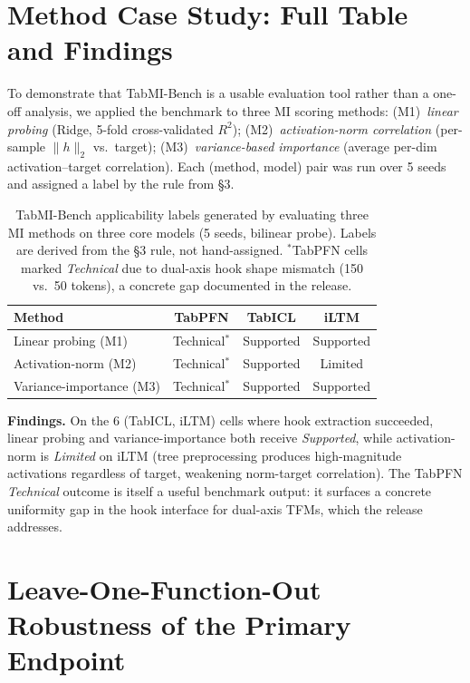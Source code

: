 \documentclass{article}
\begin{document}
\section{Method Case Study: Full Table and Findings}
\label{app:method-case-study}

To demonstrate that TabMI-Bench is a usable evaluation tool rather than a one-off analysis, we applied the benchmark to three MI scoring methods: (M1)~\emph{linear probing} (Ridge, 5-fold cross-validated $R^2$); (M2)~\emph{activation-norm correlation} (per-sample $\|h\|_2$ vs.\ target); (M3)~\emph{variance-based importance} (average per-dim activation--target correlation). Each (method, model) pair was run over 5 seeds and assigned a label by the rule from \S3.

\begin{table}[htbp]
\centering
\caption{TabMI-Bench applicability labels generated by evaluating three MI methods on three core models (5 seeds, bilinear probe). Labels are derived from the \S3 rule, not hand-assigned. $^{*}$TabPFN cells marked \emph{Technical} due to dual-axis hook shape mismatch (150 vs.\ 50 tokens), a concrete gap documented in the release.}
\label{tab:method-case-study}
\small
\begin{tabular}{@{}l c c c@{}}
\toprule
Method & TabPFN & TabICL & iLTM \\
\midrule
Linear probing (M1) & Technical$^{*}$ & Supported & Supported \\
Activation-norm (M2) & Technical$^{*}$ & Supported & Limited \\
Variance-importance (M3) & Technical$^{*}$ & Supported & Supported \\
\bottomrule
\end{tabular}
\end{table}

\textbf{Findings.} On the 6 (TabICL, iLTM) cells where hook extraction succeeded, linear probing and variance-importance both receive \emph{Supported}, while activation-norm is \emph{Limited} on iLTM (tree preprocessing produces high-magnitude activations regardless of target, weakening norm-target correlation). The TabPFN \emph{Technical} outcome is itself a useful benchmark output: it surfaces a concrete uniformity gap in the hook interface for dual-axis TFMs, which the release addresses.

\section{Leave-One-Function-Out Robustness of the Primary Endpoint}
\label{app:lofo}
\end{document}
